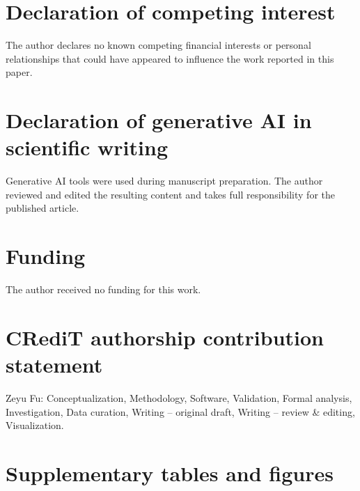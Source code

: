 \documentclass[preprint,11pt]{elsarticle}
\begin{document}
\section*{Declaration of competing interest}
The author declares no known competing financial interests or personal relationships
that could have appeared to influence the work reported in this paper.

\section*{Declaration of generative AI in scientific writing}
Generative AI tools were used during manuscript preparation. The author reviewed and edited
the resulting content and takes full responsibility for the published article.

\section*{Funding}
The author received no funding for this work.

\section*{CRediT authorship contribution statement}
Zeyu Fu: Conceptualization, Methodology, Software, Validation, Formal analysis, Investigation, Data
curation, Writing -- original draft, Writing -- review \& editing, Visualization.

\appendix
\setcounter{figure}{0}
\setcounter{table}{0}
\section{Supplementary tables and figures}
\label{app:supp}
\end{document}
